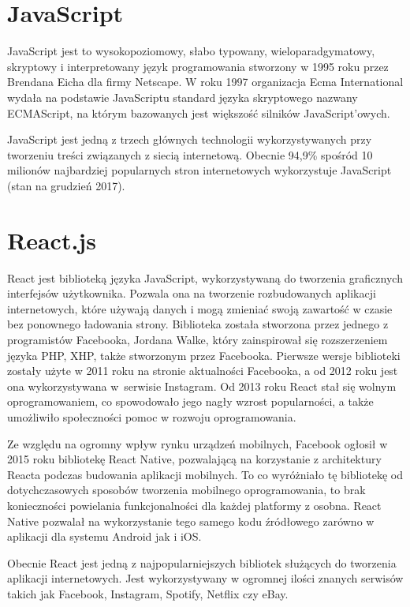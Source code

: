 \section{JavaScript}
JavaScript jest to wysokopoziomowy, słabo typowany, wieloparadgymatowy, skryptowy i interpretowany język programowania stworzony w 1995 roku przez Brendana Eicha dla firmy Netscape.  W roku 1997 organizacja Ecma International wydała na podstawie JavaScriptu standard języka skryptowego nazwany ECMAScript, na którym bazowanych jest większość silników JavaScript'owych.

JavaScript jest jedną z trzech głównych technologii wykorzystywanych przy tworzeniu treści związanych z siecią internetową. Obecnie 94,9\% spośród 10 milionów najbardziej popularnych stron internetowych wykorzystuje JavaScript (stan na grudzień 2017\cite{JSUsage}).

\section{React.js}
React jest biblioteką języka JavaScript, wykorzystywaną do tworzenia graficznych interfejsów użytkownika. Pozwala ona na tworzenie rozbudowanych aplikacji internetowych, które używają danych i mogą zmieniać swoją zawartość w czasie bez ponownego ładowania strony. Biblioteka została stworzona przez jednego z programistów Facebooka, Jordana Walke, który zainspirował się rozszerzeniem języka PHP, XHP, także stworzonym przez Facebooka. Pierwsze wersje biblioteki zostały użyte w 2011 roku na stronie aktualności Facebooka, a od 2012 roku jest ona wykorzystywana w~serwisie Instagram. Od 2013 roku React stał się wolnym oprogramowaniem, co spowodowało jego nagły wzrost popularności, a także umożliwiło społeczności  pomoc w rozwoju oprogramowania.

Ze względu na ogromny wpływ rynku urządzeń mobilnych, Facebook ogłosił w 2015 roku bibliotekę React Native, pozwalającą na korzystanie z architektury Reacta podczas budowania aplikacji mobilnych. To co wyróżniało tę bibliotekę od dotychczasowych sposobów tworzenia mobilnego oprogramowania, to brak konieczności powielania funkcjonalności dla każdej platformy z osobna. React Native pozwalał na wykorzystanie tego samego kodu źródłowego zarówno w aplikacji dla systemu Android jak i iOS.

Obecnie React jest jedną z najpopularniejszych bibliotek służących do tworzenia aplikacji internetowych. Jest wykorzystywany w ogromnej ilości znanych serwisów takich jak Facebook, Instagram, Spotify, Netflix czy eBay. 

